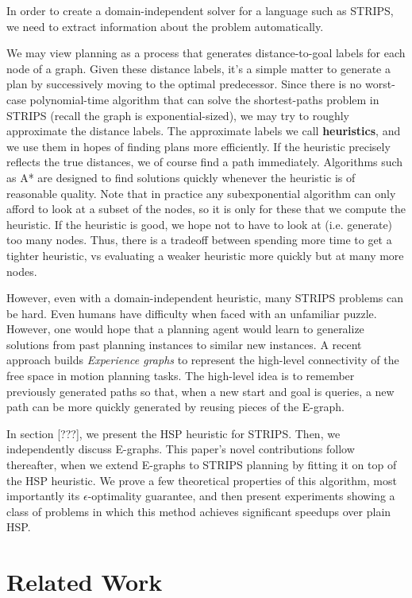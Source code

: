 \documentclass[letterpaper]{article}
\begin{document}
In order to create a domain-independent solver for a language such as STRIPS, we need to extract information about the problem automatically. 

We may view planning as a process that generates distance-to-goal labels for each node of a graph. Given these distance labels, it's a simple matter to generate a plan by successively moving to the optimal predecessor. Since there is no worst-case polynomial-time algorithm that can solve the shortest-paths problem in STRIPS (recall the graph is exponential-sized), we may try to roughly approximate the distance labels. The approximate labels we call \textbf{heuristics}, and we use them in hopes of finding plans more efficiently. If the heuristic precisely reflects the true distances, we of course find a path immediately. Algorithms such as A* are designed to find solutions quickly whenever the heuristic is of reasonable quality. Note that in practice any subexponential algorithm can only afford to look at a subset of the nodes, so it is only for these that we compute the heuristic. If the heuristic is good, we hope not to have to look at (i.e. generate) too many nodes. Thus, there is a tradeoff between spending more time to get a tighter heuristic, vs evaluating a weaker heuristic more quickly but at many more nodes.

However, even with a domain-independent heuristic, many STRIPS problems can be hard. Even humans have difficulty when faced with an unfamiliar puzzle. However, one would hope that a planning agent would learn to generalize solutions from past planning instances to similar new instances. A recent approach builds \textit{Experience graphs} to represent the high-level connectivity of the free space in motion planning tasks. The high-level idea is to remember previously generated paths so that, when a new start and goal is queries, a new path can be more quickly generated by reusing pieces of the E-graph.

In section [???], we present the HSP heuristic for STRIPS. Then, we independently discuss E-graphs. This paper's novel contributions follow thereafter, when we extend E-graphs to STRIPS planning by fitting it on top of the HSP heuristic. We prove a few theoretical properties of this algorithm, most importantly its $\epsilon$-optimality guarantee, and then present experiments showing a class of problems in which this method achieves significant speedups over plain HSP.

\section{Related Work}
\end{document}
